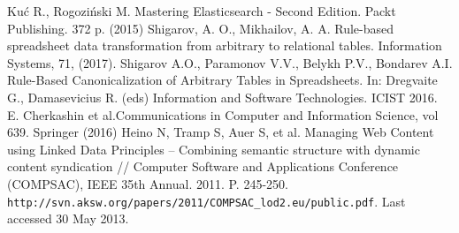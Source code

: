 \documentclass[conference,a4paper]{IEEEtran}
\providecommand\url[1]{\texttt{#1}}
\begin{document}
\begin{thebibliography}{99}
  Kuć R., Rogoziński M. Mastering Elasticsearch - Second Edition. Packt
  Publishing. 372 p. (2015)
Shigarov, A. O., Mikhailov, A. A. Rule-based spreadsheet data transformation from arbitrary to relational tables. Information Systems, 71, (2017). 
Shigarov A.O., Paramonov V.V., Belykh P.V., Bondarev A.I. Rule-Based Canonicalization of Arbitrary Tables in Spreadsheets. In: Dregvaite G., Damasevicius R. (eds) Information and Software Technologies. ICIST 2016. E. Cherkashin et al.Communications in Computer and Information Science, vol 639. Springer (2016) 
  Heino N, Tramp S, Auer S, et al. Managing Web Content using Linked
  Data Principles -- Combining semantic structure with dynamic content
  syndication // Computer Software and Applications Conference
  (COMPSAC), IEEE 35th Annual. 2011. P. 245-250.
  \url{http://svn.aksw.org/papers/2011/COMPSAC\_lod2.eu/public.pdf}. Last accessed 30 May 2013.
\end{thebibliography}
\end{document}
